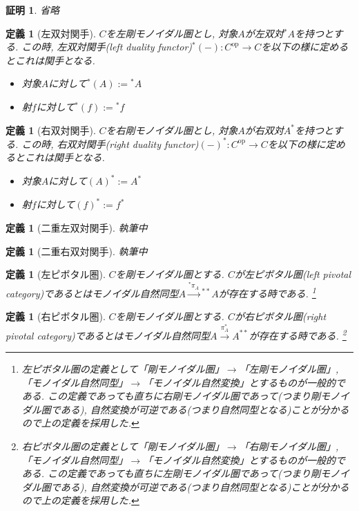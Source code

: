 \documentclass[a4paper,12pt]{ltjsarticle}
\theoremstyle{break}
\newtheorem{defn}[thm]{定義}
\newtheorem*{prf}{証明}
\newcommand{\Op}{\mathrm{op}}
\newcommand{\xr}[1]{\xrightarrow{#1}}
\numberwithin{equation}{section}
\begin{document}
\begin{prf}
  省略
\end{prf}

\begin{defn}[左双対関手]
  $C$を左剛モノイダル圏とし, 対象$A$が左双対${}^*A$を持つとする. 
  この時, 左双対関手(left duality functor)${}^*(-): C^\Op \to C$を以下の様に定めるとこれは関手となる. 
  \begin{itemize}
    \item 対象$A$に対して${}^*(A):={}^*A$
    \item 射$f$に対して${}^*(f):={}^*f$
  \end{itemize}
\end{defn}

\begin{defn}[右双対関手]
  $C$を右剛モノイダル圏とし, 対象$A$が右双対$A^*$を持つとする. 
  この時, 右双対関手(right duality functor)$(-)^*: C^\Op \to C$を以下の様に定めるとこれは関手となる. 
  \begin{itemize}
    \item 対象$A$に対して$(A)^*:=A^*$
    \item 射$f$に対して$(f)^*:=f^*$
  \end{itemize}
\end{defn}

\begin{defn}[二重左双対関手]
  執筆中
\end{defn}

\begin{defn}[二重右双対関手]
  執筆中
\end{defn}

\begin{defn}[左ピボタル圏]
  $C$を剛モノイダル圏とする. 
  $C$が左ピボタル圏(left pivotal category)であるとはモノイダル自然同型$A \xr{{}^*\pi_A} {}^{**}A$が存在する時である.
  \footnote{
      左ピボタル圏の定義として「剛モノイダル圏」$\to$「左剛モノイダル圏」, 「モノイダル自然同型」$\to$「モノイダル自然変換」とするものが一般的である. 
      この定義であっても直ちに右剛モノイダル圏であって(つまり剛モノイダル圏である), 自然変換が可逆である(つまり自然同型となる)ことが分かるので上の定義を採用した. 
    }
\end{defn}

\begin{defn}[右ピボタル圏]
  $C$を剛モノイダル圏とする. 
  $C$が右ピボタル圏(right pivotal category)であるとはモノイダル自然同型$A \xr{\pi^*_A} A^{**}$が存在する時である.
  \footnote{
      右ピボタル圏の定義として「剛モノイダル圏」$\to$「右剛モノイダル圏」, 「モノイダル自然同型」$\to$「モノイダル自然変換」とするものが一般的である. 
      この定義であっても直ちに左剛モノイダル圏であって(つまり剛モノイダル圏である), 自然変換が可逆である(つまり自然同型となる)ことが分かるので上の定義を採用した. 
    }
\end{defn}
\end{document}
